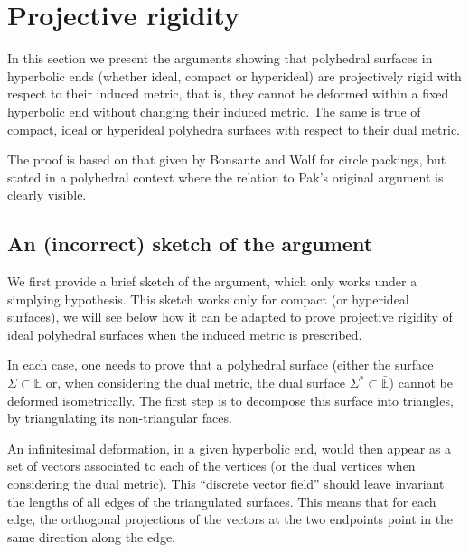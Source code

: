 \documentclass[notitlepage,twoside,a4paper]{amsart}
\theoremstyle{named}
\newcommand{\bE}{{\mathbb E}}
\begin{document}
\section{Projective rigidity}

In this section we present the arguments showing that polyhedral surfaces in hyperbolic ends (whether ideal, compact or hyperideal) are projectively rigid with respect to their induced metric, that is, they cannot be deformed within a fixed hyperbolic end without changing their induced metric. The same is true of compact, ideal or hyperideal polyhedra surfaces with respect to their dual metric.

The proof is based on that given by Bonsante and Wolf \cite{bonsante-wolf:projective} for circle packings, but stated in a polyhedral context where the relation to Pak's original argument is clearly visible.

\subsection{An (incorrect) sketch of the argument}

We first provide a brief sketch of the argument, which only works under a simplying hypothesis. This sketch works only for compact (or hyperideal surfaces), we will see below how it can be adapted to prove projective rigidity of ideal polyhedral surfaces when the induced metric is prescribed.

In each case, one needs to prove that a polyhedral surface (either the surface $\Sigma\subset \bE$ or, when considering the dual metric, the dual surface $\Sigma^*\subset \bar \bE$) cannot be deformed isometrically. The first step is to decompose this surface into triangles, by triangulating its non-triangular faces. 

An infinitesimal deformation, in a given hyperbolic end, would then appear as a set of vectors associated to each of the vertices (or the dual vertices when considering the dual metric). This ``discrete vector field'' should leave invariant the lengths of all edges of the triangulated surfaces. This means that for each edge, the orthogonal projections of the vectors at the two endpoints point in the same direction along the edge.
\end{document}
